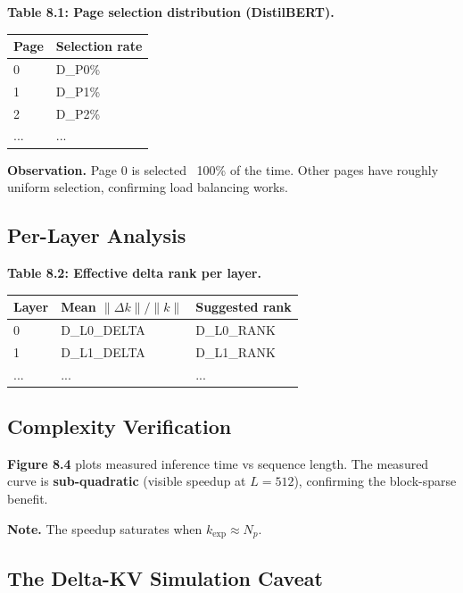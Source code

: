\textbf{Table 8.1: Page selection distribution (DistilBERT).}

\begin{table}[H]
\centering
\small
\begin{tabular}{ll}
\toprule
\textbf{Page} & \textbf{Selection rate} \\
\midrule
0 & {{D\_P0}}\% \\
1 & {{D\_P1}}\% \\
2 & {{D\_P2}}\% \\
... & ... \\
\bottomrule
\end{tabular}
\end{table}

\textbf{Observation.} Page 0 is selected ~100\% of the time. Other pages have 
roughly uniform selection, confirming load balancing works.

\subsection{Per-Layer Analysis}

\textbf{Table 8.2: Effective delta rank per layer.}

\begin{table}[H]
\centering
\small
\begin{tabular}{lll}
\toprule
\textbf{Layer} & \textbf{Mean $\|\Delta k\| / \|k\|$} & \textbf{Suggested rank} \\
\midrule
0 & {{D\_L0\_DELTA}} & {{D\_L0\_RANK}} \\
1 & {{D\_L1\_DELTA}} & {{D\_L1\_RANK}} \\
... & ... & ... \\
\bottomrule
\end{tabular}
\end{table}

\subsection{Complexity Verification}

\textbf{Figure 8.4} plots measured inference time vs sequence length. The 
measured curve is \textbf{sub-quadratic} (visible speedup at $L = 512$), 
confirming the block-sparse benefit.

\textbf{Note.} The speedup saturates when $k_\text{exp} \approx N_p$.

\subsection{The Delta-KV Simulation Caveat}

